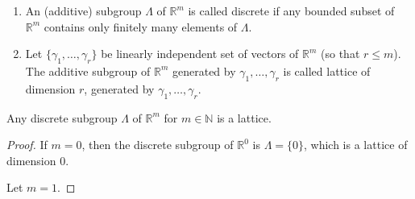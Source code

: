 \begin{defbox}
    \begin{definition}
        \begin{enumerate}
            \item An (additive) subgroup \(\Lambda\) of \(\mathbb{R}^m\) is called discrete if any bounded subset of \(\mathbb{R}^m\) contains only finitely many elements of \(\Lambda\).
            \item Let \(\{\gamma_1, \ldots, \gamma_r\}\) be linearly independent set of vectors of \(\mathbb{R}^m\) (so that \(r \leq m\)). The additive subgroup of \(\mathbb{R}^m\) generated by \(\gamma_1, \ldots, \gamma_r\) is called lattice of dimension \(r\), generated by \(\gamma_1, \ldots, \gamma_r\).
        \end{enumerate}
    \end{definition}
\end{defbox}

\begin{thmbox}
    \begin{theorem}
        Any discrete subgroup \(\Lambda\) of \(\mathbb{R}^m\) for \(m \in \mathbb{N}\) is a lattice.
    \end{theorem}
\end{thmbox}

\begin{proof}
    If \(m = 0\), then the discrete subgroup of \(\mathbb{R}^0\) is \(\Lambda = \{0\}\), which is a lattice of dimension \(0\).

    Let \(m = 1\).
\end{proof}
